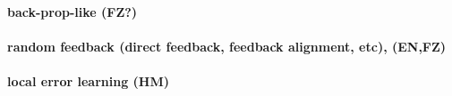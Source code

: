 \documentclass[journal,onecolumn,11pt]{IEEEtran}
\begin{document}
\paragraph{back-prop-like (FZ?)}
\paragraph{random feedback (direct feedback, feedback alignment, etc), (EN,FZ)}
\paragraph{local error learning (HM)}
\label{sec:spatial_credit_assignment}

%
\end{document}

